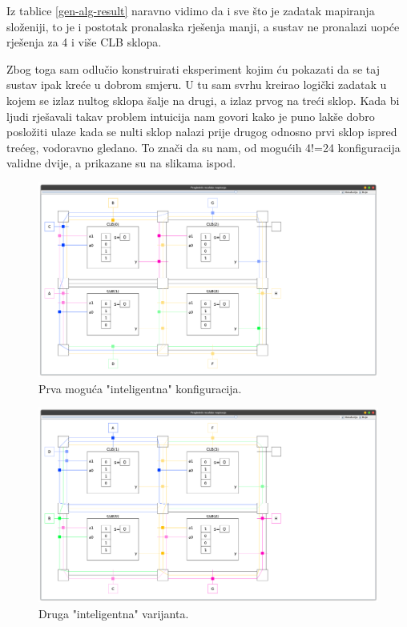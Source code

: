 \documentclass[times, utf8, zavrsni]{fer}
\begin{document}
		Iz tablice \ref{gen-alg-result} naravno vidimo da i sve što je zadatak mapiranja složeniji, to je i postotak pronalaska rješenja manji, a sustav ne pronalazi uopće rješenja za 4 i više CLB sklopa. 
		
		Zbog toga sam odlučio konstruirati eksperiment kojim ću pokazati da se taj sustav ipak kreće u dobrom smjeru. U tu sam svrhu kreirao logički zadatak u kojem se izlaz nultog sklopa šalje na drugi, a izlaz prvog na treći sklop. Kada bi ljudi rješavali takav problem intuicija nam govori kako je puno lakše dobro posložiti ulaze kada se nulti sklop nalazi prije drugog odnosno prvi sklop ispred trećeg, vodoravno gledano. To znači da su nam, od mogućih 4!=24 konfiguracija validne dvije, a prikazane su na slikama ispod.
		
		
		\begin{figure}[H]
			\centering
			\includegraphics[width=18cm]{slike/conf1.png}
			\caption{Prva moguća "inteligentna" konfiguracija. }
			\label{fig:conf1}
		\end{figure} 
		
		
		\begin{figure}[H]
			\centering
			\includegraphics[width=18cm]{slike/conf2.png}
			\caption{Druga "inteligentna" varijanta. }
			\label{fig:conf2}
		\end{figure} 
		
\end{document}
